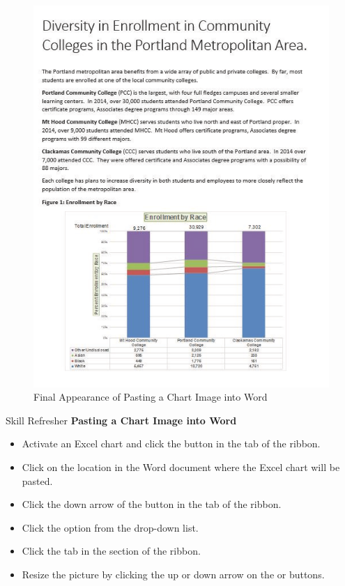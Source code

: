 \begin{figure}[H]
	\centering
	\includegraphics[width=\maxwidth{.95\linewidth}]{gfx/ch04_fig45}
	\caption{Final Appearance of Pasting a Chart Image into Word}
	\label{04:fig45}
\end{figure}

\begin{center}
	\begin{sklbox}{Skill Refresher}
		\textbf{Pasting a Chart Image into Word}
		\\
		\begin{itemize}
			\setlength{\itemsep}{0pt}
			\setlength{\parskip}{0pt}
			\setlength{\parsep}{0pt}

			\item Activate an Excel chart and click the  button in the  tab of the ribbon.
			\item Click on the location in the Word document where the Excel chart will be pasted.
			\item Click the down arrow of the  button in the  tab of the ribbon.
			\item Click the  option from the drop-down list.
			\item Click the  tab in the  section of the ribbon.
			\item Resize the picture by clicking the up or down arrow on the  or  buttons.
			
		\end{itemize}
	\end{sklbox}
\end{center}

